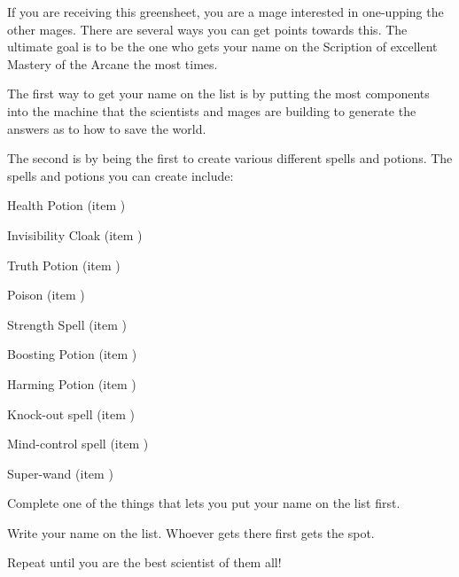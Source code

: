 \documentclass[green]{guildcamp3}
\begin{document}
	
	\name{\gMPublishing{}}
	
	
	
	If you are receiving this greensheet, you are a mage interested in one-upping the other mages. There are several ways you can get points towards this. The ultimate goal is to be the one who gets your name on the Scription of excellent Mastery of the Arcane the most times.
	
	The first way to get your name on the list is by putting the most components into the machine that the scientists and mages are building to generate the answers as to how to save the world.
	
	The second is by being the first to create various different spells and potions. The spells and potions you can create include:
	
	Health Potion (item \iHealthPotion{\MYnumber})
	
	Invisibility Cloak (item \iInvisibilityCloak{\MYnumber})
	
	Truth Potion (item \iTruthPotion{\MYnumber})
	
	Poison (item \iMagicPoison{\MYnumber})
	
	Strength Spell (item \iStrengthSpell{\MYnumber})
	
	Boosting Potion (item \iCRUpPotion{\MYnumber})
	
	Harming Potion (item \iCRDownPotion{\MYnumber})
	
	Knock-out spell (item \iKOSpell{\MYnumber})
	
	Mind-control spell (item \iMCSpell{\MYnumber})
	
	Super-wand (item \iUpgradedMagicGun{})
	
	
	\begin{enum}[Directions]
		\item Complete one of the things that lets you put your name on the list first.
		\item Write your name on the list. Whoever gets there first gets the spot. 
		\item Repeat until you are the best scientist of them all!
	\end{enum}
	
	
\end{document}
